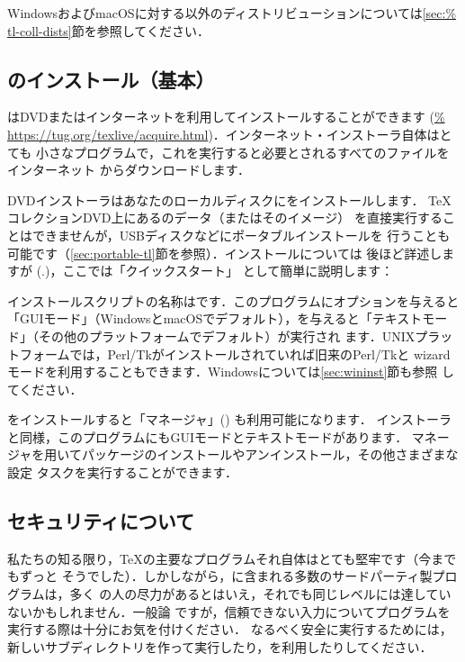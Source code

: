 \documentclass[uplatex,dvipdfmx,tombow]{jsarticle}
\begin{document}
WindowsおよびmacOSに対する\TL 以外のディストリビューションについては\ref{sec:%
tl-coll-dists}節を参照してください．

\subsection{\TL のインストール（基本）}
\label{sec:basic}

\TL はDVDまたはインターネットを利用してインストールすることができます (\url{%
https://tug.org/texlive/acquire.html})．インターネット・インストーラ自体はとても
小さなプログラムで，これを実行すると必要とされるすべてのファイルをインターネット
からダウンロードします．

DVDインストーラはあなたのローカルディスクに\TL をインストールします．
\TeX コレクションDVD上にある\TL のデータ（またはそのイメージ）
を直接実行することはできませんが，USBディスクなどにポータブルインストールを
行うことも可能です（\ref{sec:portable-tl}節を参照）．インストールについては
後ほど詳述しますが (\p.\pageref{sec:install})，ここでは「クイックスタート」
として簡単に説明します：

\begin{itemize*}
\item インストールスクリプトの名称はです．このプログラムにオプションを与えると「GUIモード」（WindowsとmacOSでデフォルト），を与えると「テキストモード」（その他のプラットフォームでデフォルト）が実行され
ます．UNIXプラットフォームでは，Perl/Tkがインストールされていれば旧来のPerl/Tkと
wizardモードを利用することもできます．Windowsについては\ref{sec:wininst}節も参照
してください．

\item \TL をインストールすると「\TL マネージャ」() も利用可能になります．
インストーラと同様，このプログラムにもGUIモードとテキストモードがあります．\TL
マネージャを用いてパッケージのインストールやアンインストール，その他さまざまな設定
タスクを実行することができます．
\end{itemize*}

\subsection{セキュリティについて}
\label{sec:security}

私たちの知る限り，\TeX の主要なプログラムそれ自体はとても堅牢です（今までもずっと
そうでした）．しかしながら，\TL に含まれる多数のサードパーティ製プログラムは，多く
の人の尽力があるとはいえ，それでも同じレベルには達していないかもしれません．一般論
ですが，信頼できない入力についてプログラムを実行する際は十分にお気を付けください．
なるべく安全に実行するためには，新しいサブディレクトリを作って実行したり，を利用したりしてください．
\end{document}
